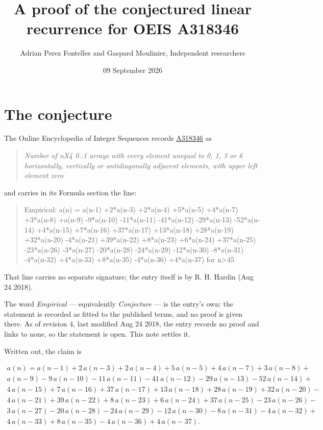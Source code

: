 \documentclass[11pt]{article}
\title{A proof of the conjectured linear recurrence for OEIS A318346}
\author{Adrian Perez Fontelles and Gaspard Moulinier, Independent researchers}
\date{09 September 2026}
\theoremstyle{definition}
\begin{document}
\maketitle
\section{The conjecture}

The Online Encyclopedia of Integer Sequences records \href{https://oeis.org/A318346}{A318346} as

\begin{quote}\itshape Number of nX4 0..1 arrays with every element unequal to 0, 1, 3 or 6 horizontally, vertically or antidiagonally adjacent elements, with upper left element zero\end{quote}

and carries in its Formula section the line:

\begin{quote}\ttfamily Empirical: a(n) = a(n-1) +2*a(n-3) +2*a(n-4) +5*a(n-5) +4*a(n-7) +3*a(n-8) +a(n-9) -9*a(n-10) -11*a(n-11) -41*a(n-12) -29*a(n-13) -52*a(n-14) +4*a(n-15) +7*a(n-16) +37*a(n-17) +13*a(n-18) +28*a(n-19) +32*a(n-20) -4*a(n-21) +39*a(n-22) +8*a(n-23) +6*a(n-24) +37*a(n-25) -23*a(n-26) -3*a(n-27) -20*a(n-28) -24*a(n-29) -12*a(n-30) -8*a(n-31) -4*a(n-32) +4*a(n-33) +8*a(n-35) -4*a(n-36) +4*a(n-37) for n>45\end{quote}

That line carries no separate signature; the entry itself is by R. H. Hardin (Aug 24 2018).

The word {\itshape Empirical} --- equivalently {\itshape Conjecture} --- is the entry's own: the statement is recorded as fitted to the published terms, and no proof is given there. As of revision 4, last modified Aug 24 2018, the entry records no proof and links to none, so the statement is open. This note settles it.

Written out, the claim is

\begin{multline*} a(n) = a(n-1) + 2\,a(n-3) + 2\,a(n-4) + 5\,a(n-5) + 4\,a(n-7) + 3\,a(n-8) + \\ a(n-9) - 9\,a(n-10) - 11\,a(n-11) - 41\,a(n-12) - 29\,a(n-13) - 52\,a(n-14) + \\ 4\,a(n-15) + 7\,a(n-16) + 37\,a(n-17) + 13\,a(n-18) + 28\,a(n-19) + 32\,a(n-20) - \\ 4\,a(n-21) + 39\,a(n-22) + 8\,a(n-23) + 6\,a(n-24) + 37\,a(n-25) - 23\,a(n-26) - \\ 3\,a(n-27) - 20\,a(n-28) - 24\,a(n-29) - 12\,a(n-30) - 8\,a(n-31) - 4\,a(n-32) + \\ 4\,a(n-33) + 8\,a(n-35) - 4\,a(n-36) + 4\,a(n-37). \end{multline*}
\end{document}
